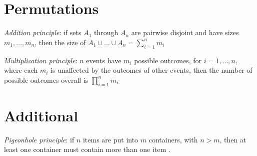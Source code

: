 \section{Permutations}

{\it Addition principle}: if sets $A_{1}$ through $A_{n}$ are pairwise disjoint and have sizes $m_{1},\ldots,m_{n}$, then the size of $A_{1}\cup\ldots\cup A_{n}=\sum\limits_{i=1}^{n}m_{i}$

{\it Multiplication principle}: $n$ events have
$m_{i}$ possible outcomes, for $i=1,\ldots,n$, where each $m_{i}$ is unaffected
by the outcomes of other events, then the number of possible outcomes overall is
$\prod\limits_{i=1}^{n}m_{i}$

\section{Additional}

{\it Pigeonhole principle}: if $n$ items are put
into $m$ containers, with $n > m$, then at least one container must contain more
than one item \cite{pigeonhole-principle}.
